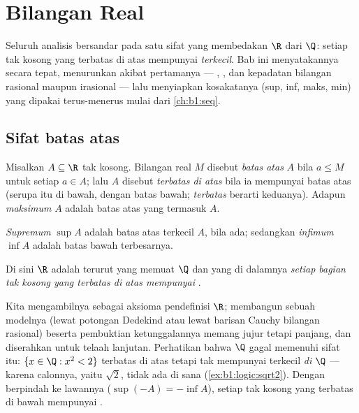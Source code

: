\chapter{Bilangan Real}\label{ch:b1:reals}

Seluruh analisis bersandar pada satu sifat yang membedakan $\R$ dari
$\Q$: setiap  tak kosong yang terbatas di atas mempunyai 
\emph{terkecil}. Bab ini menyatakannya secara tepat, menurunkan akibat
pertamanya --- , , dan
kepadatan bilangan rasional maupun irasional --- lalu menyiapkan
kosakatanya (sup, inf, maks, min) yang dipakai terus-menerus mulai dari
\cref{ch:b1:seq}.

\section{Sifat batas atas}

\begin{definition}\label{def:b1:reals:bounds}
Misalkan $A \subseteq \R$ tak kosong. Bilangan real $M$ disebut \emph{batas
atas} $A$ bila $a \leq M$ untuk setiap $a \in A$;
lalu $A$ disebut \emph{terbatas di atas} bila ia mempunyai batas atas (serupa itu di
bawah, dengan batas bawah; \emph{terbatas} berarti keduanya). Adapun
\emph{maksimum} $A$ adalah batas atas yang termasuk $A$.

\emph{Supremum} $\sup A$ adalah batas atas terkecil
$A$, bila ada; sedangkan \emph{infimum} $\inf A$ adalah
batas bawah terbesarnya.
\end{definition}

\begin{theorem}\label{thm:b1:reals:sup}
Di sini $\R$ adalah  terurut yang memuat $\Q$ dan yang di dalamnya \emph{setiap
 bagian tak kosong yang terbatas di atas mempunyai }.
\end{theorem}
\admitted

\begin{remark}
Kita mengambilnya sebagai aksioma pendefinisi $\R$; membangun sebuah modelnya (lewat
potongan Dedekind atau lewat barisan Cauchy bilangan rasional) beserta pembuktian
ketunggalannya memang jujur tetapi panjang, dan diserahkan untuk telaah lanjutan. Perhatikan
bahwa $\Q$ gagal memenuhi sifat itu: $\{x \in \Q : x^2 < 2\}$ terbatas
di atas tetapi tak mempunyai  terkecil \emph{di $\Q$} --- karena calonnya,
yaitu $\sqrt 2$, tidak ada di sana (\cref{ex:b1:logic:sqrt2}). Dengan berpindah ke
lawannya ($\sup(-A) = -\inf A$), setiap  tak kosong yang terbatas di bawah
mempunyai .
\end{remark}

